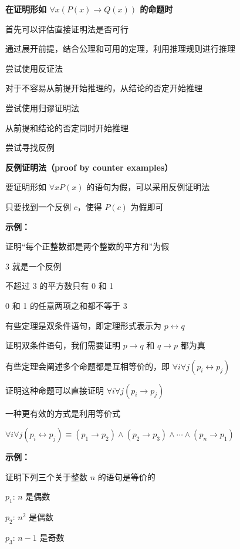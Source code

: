 \documentclass[UTF8]{report}
\theoremstyle{MyLineTheoremStyle} %
\theoremstyle{MyBlockTheoremStyle} %
\theoremstyle{MySubsubsectionStyle} %
\begin{document}
\textbf{在证明形如 $\forall x (P(x) \rightarrow Q(x))$ 的命题时}\par
首先可以评估直接证明法是否可行\par
通过展开前提，结合公理和可用的定理，利用推理规则进行推理\par
\vspace{1em}
尝试使用反证法\par
对于不容易从前提开始推理的，从结论的否定开始推理\par
\vspace{1em}
尝试使用归谬证明法\par
从前提和结论的否定同时开始推理\par
\vspace{1em}
尝试寻找反例\par
\vspace{1em}
\textbf{反例证明法（proof by counter examples）}\par
要证明形如 $\forall x P(x)$ 的语句为假，可以采用反例证明法\par
只要找到一个反例 $c$，使得 $P(c)$ 为假即可\par
\vspace{1em}
\textbf{示例：}\par
证明“每个正整数都是两个整数的平方和”为假\par
3 就是一个反例\par
不超过 3 的平方数只有 0 和 1\par
0 和 1 的任意两项之和都不等于 3\par
\vspace{1em}
有些定理是双条件语句，即定理形式表示为 $p \leftrightarrow q$\par
证明双条件语句，我们需要证明 $p \rightarrow q$ 和 $q \rightarrow p$ 都为真\par
\vspace{1em}
有些定理会阐述多个命题都是互相等价的，即 $\forall i \forall j (p_i \leftrightarrow p_j)$\par
证明这种命题可以直接证明 $\forall i \forall j (p_i \rightarrow p_j)$\par
\vspace{1em}
一种更有效的方式是利用等价式\par
$\forall i \forall j (p_i \leftrightarrow p_j) \equiv (p_1 \rightarrow p_2) \land (p_2 \rightarrow p_3) \land \cdots \land (p_n \rightarrow p_1)$\par
\vspace{1em}
\textbf{示例：}\par
证明下列三个关于整数 $n$ 的语句是等价的\par
$p_1$: $n$ 是偶数\par
$p_2$: $n^2$ 是偶数\par
$p_3$: $n - 1$ 是奇数\par
\end{document}
